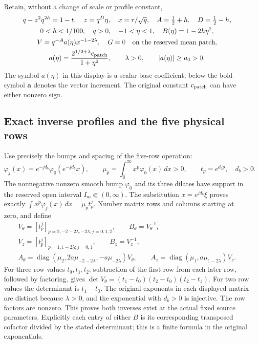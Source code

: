 \documentclass[11pt]{article}
\begin{document}
Retain, without a change of scale or profile constant,
\begin{equation}\label{mcmean:original_scale}
\begin{gathered}
 q-z^2q^{2h}=1-t,\quad z=q^D\eta,\quad x=r/\sqrt q,\quad
 A=\tfrac12+h,\quad D=\tfrac12-h,\\
 0<h<1/100,\quad q>0,\quad -1<\eta<1,\quad
 B(\eta)=1-2h\eta^2,\\
 V=q^{-A}a(\eta)x^{-1-2\lambda},\quad G=0
 \quad\hbox{on the reserved mean patch},\\
 a(\eta)=\frac{2^{1/2+\lambda}c_{\rm patch}}{1+\eta^2},
 \qquad \lambda>0,\qquad |a(\eta)|\ge a_0>0.
\end{gathered}
\end{equation}
The symbol \(a(\eta)\) in this display is a scalar base coefficient;
below the bold symbol \(\boldsymbol a\) denotes the vector increment.
The original constant \(c_{\rm patch}\) can have either nonzero sign.

\subsection{Exact inverse profiles and the five physical rows}

Use precisely the bumps and spacing of the five-row operation:
\[
 \varphi_j(x)=e^{-jd_b}\varphi_0(e^{-jd_b}x),\qquad
 \mu_p=\int_0^\infty x^p\varphi_0(x)\,dx>0,
 \qquad t_p=e^{d_bp},\quad d_b>0.
\]
The nonnegative nonzero smooth bump \(\varphi_0\) and its three
dilates have support in the reserved open interval \(I_m\Subset(0,\infty)\).
The substitution \(x=e^{jd_b}\xi\) proves exactly
\(\int x^p\varphi_j(x)\,dx=\mu_p t_p^j\).
Number matrix rows and columns starting at zero, and define
\begin{equation}\label{mcmean:vandermonde}
\begin{gathered}
 V_\theta=[t_p^j]_{p=2,-2-2\lambda,-2\lambda; j=0,1,2},
 \qquad B_\theta=V_\theta^{-1},\\
 V_z=[t_p^j]_{p=1,1-2\lambda; j=0,1},
 \qquad B_z=V_z^{-1},\\
 A_\theta=\operatorname{diag}
  (\mu_2,2a\mu_{-2-2\lambda},-a\mu_{-2\lambda})V_\theta,
 \qquad
 A_z=\operatorname{diag}(\mu_1,a\mu_{1-2\lambda})V_z.
\end{gathered}
\end{equation}
For three row values \(t_0,t_1,t_2\), subtraction of the first row
from each later row, followed by factoring, gives
\(\det V_\theta=(t_1-t_0)(t_2-t_0)(t_2-t_1)\).
For two row values the determinant is \(t_1-t_0\).
The original exponents in each displayed matrix are distinct because
\(\lambda>0\), and the exponential with \(d_b>0\) is injective.
The row factors are nonzero. This proves both inverses exist at the
actual fixed source parameters. Explicitly each entry of either
\(B\) is its corresponding transposed cofactor divided by the stated
determinant; this is a finite formula in the original exponentials.
\end{document}
